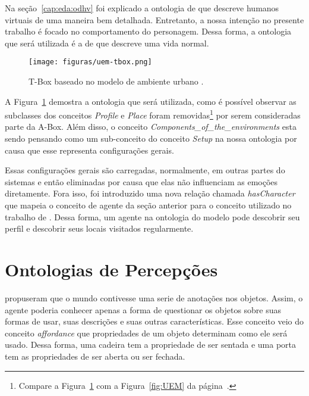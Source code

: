 Na seção~\ref{cap:eda:odhv} foi explicado a ontologia de
\citet{Gutierrez:2007:OVH:1229160.1229164} que descreve humanos virtuais de
uma maneira bem detalhada. Entretanto, a nossa intenção no presente trabalho é
focado no comportamento do personagem. Dessa forma, a ontologia que será
utilizada é a de \citet{paiva2005ontology} que descreve uma vida normal.

\begin{figure}[t]
  \centering
    \texttt{[image: figuras/uem-tbox.png]}
  \caption{T-Box baseado no modelo de ambiente urbano \cite{paiva2005ontology}.}
  \label{fig:UEM:TBOX}
\end{figure}

A Figura~\ref{fig:UEM:TBOX} demostra a ontologia que será utilizada, como é
possível observar as subclasses dos conceitos \emph{Profile} e \emph{Place}
foram removidas\footnote{Compare a Figura~\ref{fig:UEM:TBOX} com a
Figura~\ref{fig:UEM} da página~\pageref{fig:UEM}.} por serem consideradas parte
da A-Box. Além disso, o conceito \emph{Components\_of\_the\_environments} esta
sendo pensando como um sub-conceito do conceito \emph{Setup} na nossa
ontologia por causa que esse representa configurações gerais.

Essas configurações gerais são carregadas, normalmente, em outras partes do
sistemas e então eliminadas por causa que elas não influenciam as emoções
diretamente. Fora isso, foi introduzido uma nova relação chamada
\emph{hasCharacter} que mapeia o conceito de agente da seção anterior para o
conceito utilizado no trabalho de \citet{paiva2005ontology}. Dessa forma, um
agente na ontologia do modelo \occ pode descobrir seu perfil e descobrir seus
locais visitados regularmente.


\section{Ontologias de Percepções} \label{cap:tp:odp}

\citet{doyle1998annotated} propuseram que o mundo contivesse uma serie de
anotações nos objetos. Assim, o agente poderia conhecer apenas a forma de
questionar os objetos sobre suas formas de usar, suas descrições e suas outras
características. Esse conceito veio do conceito \emph{affordance} que
propriedades de um objeto determinam como ele será usado. Dessa forma, uma
cadeira tem a propriedade de ser sentada e uma porta tem as propriedades de
ser aberta ou ser fechada.


